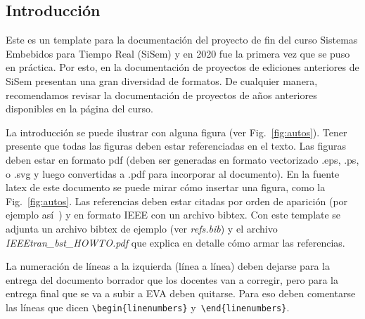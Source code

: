 \documentclass[a4paper,12pt]{article}
\begin{document}
\begin{linenumbers}

\newpage
\setcounter{page}{1}
\tableofcontents

\section{Introducci\'on}
\label{sec:introduccion}

Este es un template para la documentaci\'on del proyecto de fin del curso Sistemas Embebidos para Tiempo Real (SiSem) y en 2020 fue la primera vez que se puso en pr\'actica. Por esto, en la documentaci\'on de proyectos de ediciones anteriores de SiSem presentan una gran diversidad de formatos. De cualquier manera, recomendamos revisar la documentaci\'on de proyectos de a\~nos anteriores disponibles en la p\'agina del curso.

La introducción se puede ilustrar con alguna figura (ver Fig.~\ref{fig:autos}). Tener presente que todas las figuras deben estar referenciadas en el texto. Las figuras deben estar en formato pdf (deben ser generadas en formato vectorizado .eps, .ps, o .svg y luego convertidas a .pdf para incorporar al documento). En la fuente latex de este documento se puede mirar cómo insertar una figura, como la Fig.~\ref{fig:autos}. Las referencias deben estar citadas por orden de aparici\'on (por ejemplo as\'i~\cite{arbio2015}\cite{CodeComposer}\cite{Alley2018}\cite{Olloniego2019}\cite{Dang2015}\cite{Branco2019}) y en formato IEEE con un archivo bibtex. Con este template se adjunta un archivo bibtex de ejemplo (ver \textit{refs.bib}) y el archivo \textit{IEEEtran\_bst\_HOWTO.pdf} que explica en detalle cómo armar las referencias.

La numeraci\'on de l\'ineas a la izquierda (l\'inea a l\'inea) deben dejarse para la entrega del documento borrador que los docentes van a corregir, pero para la entrega final que se va a subir a EVA deben quitarse. Para eso deben comentarse las líneas que dicen \verb!\begin{linenumbers}! y~\verb!\end{linenumbers}!.


\end{linenumbers}
\end{document}
